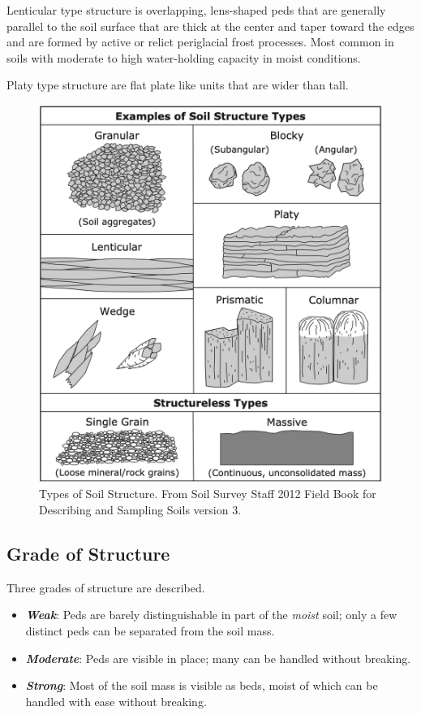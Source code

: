 \documentclass[a5paper]{report}
\begin{document}
Lenticular type structure is overlapping, lens-shaped peds that are  generally parallel to the soil surface that are thick at the center and taper toward the edges and are formed by active or relict periglacial frost processes. Most common in soils with moderate to high water-holding capacity in moist conditions.

Platy type structure are flat plate like units that are wider than tall.

\begin{figure}
    \centering
    \includegraphics[width=0.8\columnwidth]{images/FieldBookVer3_ExamplesSoilStructureTypes1045x1145.png}
    \caption{Types of Soil Structure. From Soil Survey Staff 2012 Field Book for Describing and Sampling Soils version 3.}
    \label{fig:SoilStructureTypes}
\end{figure}

\subsection{Grade of Structure}
    
Three grades of structure are described.

\begin{itemize}
    \item \textbf{\emph{Weak}}: Peds are barely distinguishable in part of the \emph{moist} soil; only a few distinct peds can be separated from the soil mass.
    \item \textbf{\emph{Moderate}}: Peds are visible in place; many can be handled without breaking.
    \item \textbf{\emph{Strong}}: Most of the soil mass is visible as beds, moist of which can be handled with ease without breaking.
\end{itemize}
\end{document}
